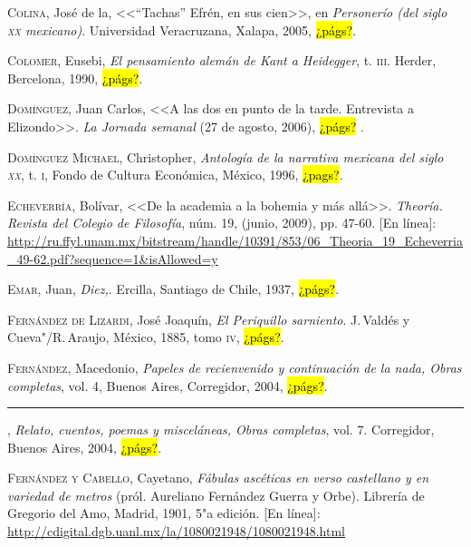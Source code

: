 \documentclass[14pt,twoside,final]{extbook} %
\begin{document}
\textsc{Colina}, José de la, <<``Tachas'' Efrén, en sus cien>>, en \emph{Personerío (del siglo \textsc{xx} mexicano)}. Universidad Veracruzana, Xalapa, 2005, \hl{¿págs?}.\label{bib:colina2005}

\textsc{Colomer}, Eusebi, \emph{El pensamiento alemán de Kant a Heidegger}, t. \textsc{iii}. Herder, Bercelona, 1990, \hl{¿págs?}.\label{bib:colomer1990}

\textsc{Domínguez}, Juan Carlos, <<A las dos en punto de la tarde. Entrevista a Elizondo>>. \emph{La Jornada semanal} (27 de agosto, 2006), \hl{¿págs?} .\label{bib:dominguez2006}

\textsc{Domínguez Michael}, Christopher, \emph{Antología de la narrativa mexicana del siglo \textsc{xx}}, t. \textsc{i}, Fondo de Cultura Económica, México, 1996, \hl{¿pags?}.\label{bib:dominguez1996}

\textsc{Echeverría}, Bolívar, <<De la academia a la bohemia y más allá>>. \emph{Theoría. Revista del Colegio de Filosofía}, núm. 19, (junio, 2009), pp. 47-60. [En línea]: \url{http://ru.ffyl.unam.mx/bitstream/handle/10391/853/06_Theoria_19_Echeverria_49-62.pdf?sequence=1&isAllowed=y}\label{bib:echeverria2009}

\textsc{Emar}, Juan, \emph{Diez,}. Ercilla, Santiago de Chile, 1937, \hl{¿págs?}.\label{bib:emar1937}

\textsc{Fernández de Lizardi}, José Joaquín, \emph{El Periquillo sarniento}. J.\,Valdés y Cueva"/R.\,Araujo, México, 1885, tomo \textsc{iv}, \hl{¿págs?}.\label{bib:fernandezlizardi1885}

\textsc{Fernández}, Macedonio, \emph{Papeles de recienvenido y continuación de la nada, Obras completas}, vol. 4, Buenos Aires, Corregidor, 2004, \hl{¿págs?}.\label{bib:fernandez2004a}

\rule{1cm}{0.4pt}, \emph{Relato, cuentos, poemas y misceláneas, Obras completas}, vol. 7. Corregidor, Buenos Aires, 2004, \hl{¿págs?}.\label{bib:fernandez2004b}

\textsc{Fernández y Cabello}, Cayetano, \emph{Fábulas ascéticas en verso castellano y en variedad de metros} (pról. Aureliano Fernández Guerra y Orbe). Librería de Gregorio del Amo, Madrid, 1901, 5"a edición. [En línea]: \url{http://cdigital.dgb.uanl.mx/la/1080021948/1080021948.html}
\end{document}
